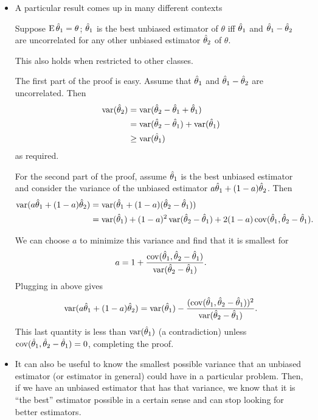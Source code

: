 \begin{itemize}[leftmargin=0pt]
\item A particular result comes up in many different contexts
  \begin{thm}
    Suppose $\operatorname{E} \hat{\theta}_1 = \theta$; $\hat{\theta}_1$ is the best unbiased estimator of
    $\theta$ iff $\hat{\theta}_1$ and $\hat{\theta}_1 - \hat{\theta}_2$ are uncorrelated for any other
    unbiased estimator $\hat{\theta}_2$ of $\theta$.
  \end{thm}
  This also holds when restricted to other classes.

  The first part of the proof is easy.  Assume that $\hat{\theta}_1$ and $\hat{\theta}_1 -
  \hat{\theta}_2$ are uncorrelated.  Then
  \begin{align*}
    \operatorname{var}(\hat{\theta}_2) &= \operatorname{var}(\hat{\theta}_2 - \hat{\theta}_1 + \hat{\theta}_1) \\
    &= \operatorname{var}(\hat{\theta}_2 - \hat{\theta}_1) + \operatorname{var}(\hat{\theta}_1) \\
    &\geq \operatorname{var}(\hat{\theta}_1)
  \end{align*}
  as required.

  For the second part of the proof, assume $\hat{\theta}_1$ is the best unbiased
  estimator and consider the variance of the unbiased estimator $a
  \hat{\theta}_1 + (1 - a) \hat{\theta}_2$.  Then
  \begin{align*}
    \operatorname{var}(a \hat{\theta}_1 + (1 - a) \hat{\theta}_2)
    &= \operatorname{var}(\hat{\theta}_1 + (1 - a) (\hat{\theta}_2 - \hat{\theta}_1)) \\
    &= \operatorname{var}(\hat{\theta}_1) + (1 - a)^2 \operatorname{var}(\hat{\theta}_2 - \hat{\theta}_1)
    + 2 (1 - a) \operatorname{cov}(\hat{\theta}_1, \hat{\theta}_2 - \hat{\theta}_1).
  \end{align*}

  We can choose $a$ to minimize this variance and find that it is
  smallest for
  \begin{equation*}
    a = 1 + \frac{\operatorname{cov}(\hat{\theta}_1, \hat{\theta}_2 - \hat{\theta}_1)}{\operatorname{var}(\hat{\theta}_2 - \hat{\theta}_1)}.
  \end{equation*}
  Plugging in above gives
  \begin{equation*}
    \operatorname{var}(a \hat{\theta}_1 + (1 - a) \hat{\theta}_2)
    = \operatorname{var}(\hat{\theta}_1) - \frac{(\operatorname{cov}(\hat{\theta}_1, \hat{\theta}_2 - \hat{\theta}_1))^2}{\operatorname{var}(\hat{\theta}_2 - \hat{\theta}_1)}.
  \end{equation*}
  This last quantity is less than $\operatorname{var}(\hat{\theta}_1)$ (a contradiction)
  unless $\operatorname{cov}(\hat{\theta}_1, \hat{\theta}_2 - \hat{\theta}_1) = 0$, completing the proof.

\item It can also be useful to know the smallest possible variance
  that an unbiased estimator (or estimator in general) could have in a
  particular problem.  Then, if we have an unbiased estimator that has
  that variance, we know that it is ``the best'' estimator possible in
  a certain sense and can stop looking for better estimators.


\end{itemize}
